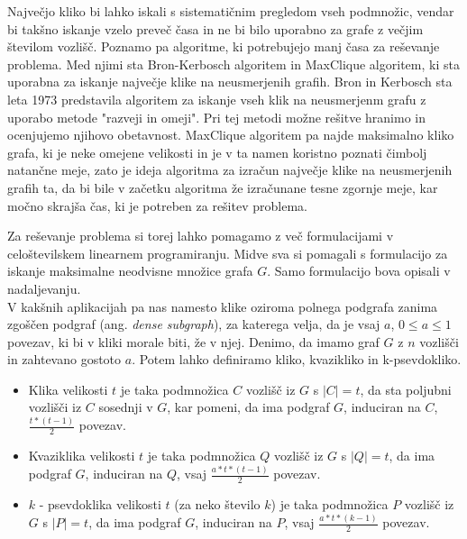 \documentclass[12pt,a4paper]{amsart}
\theoremstyle{definition}
\theoremstyle{plain}
\begin{document}
Največjo kliko bi lahko iskali s sistematičnim pregledom vseh podmnožic, vendar bi takšno iskanje vzelo preveč časa in ne bi bilo uporabno za grafe z večjim številom vozlišč. Poznamo pa algoritme, ki potrebujejo manj časa za reševanje problema. Med njimi sta Bron-Kerbosch algoritem in MaxClique algoritem, ki sta uporabna za iskanje največje klike na neusmerjenih grafih. Bron in Kerbosch sta leta 1973 predstavila algoritem za iskanje vseh klik na neusmerjenm grafu z uporabo metode "razveji in omeji". Pri tej metodi možne rešitve hranimo in ocenjujemo njihovo obetavnost. MaxClique algoritem pa najde maksimalno kliko grafa, ki je neke omejene velikosti in je v ta namen koristno poznati čimbolj natančne meje, zato je ideja algoritma za izračun največje klike na neusmerjenih grafih ta, da bi bile v začetku algoritma že izračunane tesne zgornje meje, kar močno skrajša čas, ki je potreben za rešitev problema.

Za reševanje problema si torej lahko pomagamo z več formulacijami v celoštevilskem linearnem programiranju. Midve sva si pomagali s formulacijo za iskanje maksimalne neodvisne množice grafa $G$. Samo formulacijo bova opisali v nadaljevanju.\\

V kakšnih aplikacijah pa nas namesto klike oziroma polnega podgrafa zanima zgoščen podgraf (ang. \textit{dense subgraph}), za katerega velja, da je vsaj $a$, $0 \leq a \leq 1$  povezav, ki bi v kliki morale biti, že v njej.  Denimo, da imamo graf $G$ z $n$ vozlišči in zahtevano gostoto $a$. Potem lahko definiramo kliko, kvazikliko in k-psevdokliko. 

\begin{itemize}
\item Klika velikosti $t$ je taka podmnožica $C$ vozlišč iz $G$ s $|C| = t$, da sta poljubni vozlišči iz $C$ sosednji v $G$, kar pomeni, da ima podgraf $G$, induciran na $C$, $\frac{t*(t-1)}{2}$ povezav.

\item Kvaziklika velikosti $t$ je taka podmnožica $Q$ vozlišč iz $G$ s $|Q| = t$, da ima podgraf $G$, induciran na $Q$, vsaj $\frac{a*t*(t-1)}{2}$ povezav.

\item $k$ - psevdoklika velikosti $t$ (za neko število $k$) je taka podmnožica $P$ vozlišč iz $G$ s $|P| = t$, da ima podgraf $G$, induciran na $P$, vsaj $\frac{a*t*(k-1)}{2}$ povezav.

\end{itemize}
\end{document}
